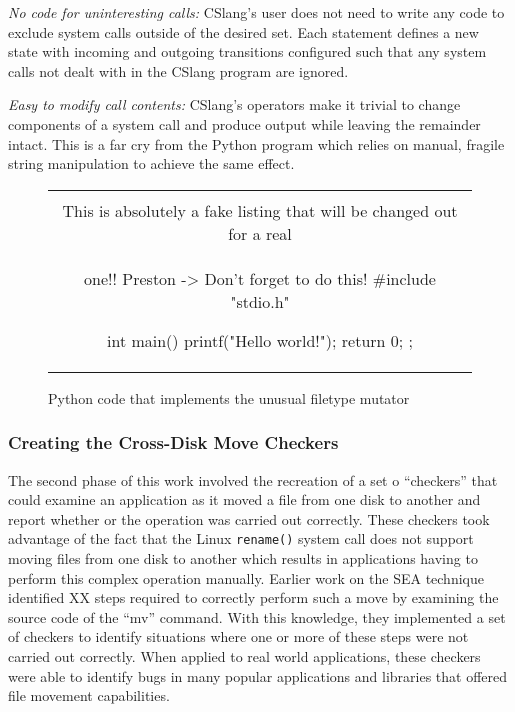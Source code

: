 \textit{No code for uninteresting calls:} CSlang's user does
not need to write any code to exclude system
calls outside of the desired set.  Each statement defines a new state with
incoming and outgoing transitions configured such that any system calls not
dealt with in the CSlang program are ignored.

\textit{Easy to modify call contents:}  CSlang's operators make it
trivial to change components of a system call
and produce output while leaving the remainder intact.  This is a far cry
from the Python program which relies on manual, fragile string manipulation
to achieve the same effect.


\begin{figure}[H]
\centering
\begin{tabular}{c}
\begin{lstlisting}
\\ This is absolutely a fake listing that will be changed out for a real
\\ one!!  Preston -> Don't forget to do this!
#include "stdio.h"

int main() {
    printf("Hello world!\n");
    return 0;
};
\end{lstlisting}
\end{tabular}
\caption{Python code that implements the unusual filetype mutator}
\label{lst:UnusualFiletypePython}
\end{figure}

\subsubsection{Creating the Cross-Disk Move Checkers}

The second phase of this work involved the recreation of a set o
``checkers'' that could examine an application as it moved a file from one
disk to another and report whether or the operation was carried
out correctly.  These checkers took advantage of the fact that the Linux
{\tt rename()} system call does not support moving files from one disk to
another which results in applications having to perform this complex
operation manually.  Earlier work on the SEA technique
identified XX steps required to
correctly perform such a move by examining the source code of the ``mv''
command.  With this knowledge, they
implemented a set of checkers to identify situations where one
or more of these steps were not carried out correctly.
When applied to real world applications,
these checkers were able to identify bugs
in many popular applications and libraries that offered file movement
capabilities.

